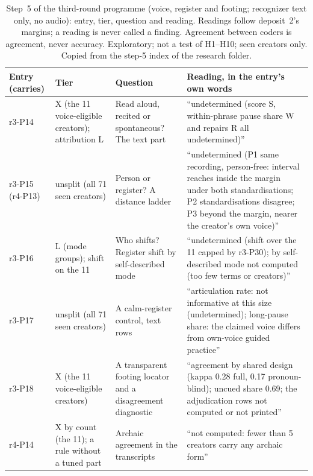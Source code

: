 \begin{table}[tp]
\centering
\footnotesize
\begin{tabular}{@{}>{\raggedright\arraybackslash}p{}>{\raggedright\arraybackslash}p{}>{\raggedright\arraybackslash}p{}p{}@{}}
\toprule
Entry (carries) & Tier & Question & Reading, in the entry's own words \\
\midrule
r3-P14 & X (the 11 voice-eligible creators); attribution L & Read aloud, recited or spontaneous? The text part &
``undetermined (score S, within-phrase pause share W and repairs R all undetermined)'' \\
r3-P15 (r4-P13) & unsplit (all 71 seen creators) & Person or register? A distance ladder & ``undetermined (P1 same
recording, person-free: interval reaches inside the margin under both standardisations; P2 standardisations disagree; P3
beyond the margin, nearer the creator's own voice)'' \\
r3-P16 & L (mode groups); shift on the 11 & Who shifts? Register shift by self-described mode & ``undetermined (shift
over the 11 capped by r3-P30); by self-described mode not computed (too few terms or creators)'' \\
r3-P17 & unsplit (all 71 seen creators) & A calm-register control, text rows & ``articulation rate: not informative at
this size (undetermined); long-pause share: the claimed voice differs from own-voice guided practice'' \\
r3-P18 & X (the 11 voice-eligible creators) & A transparent footing locator and a disagreement diagnostic &
``agreement by shared design (kappa 0.28 full, 0.17 pronoun-blind); uncued share 0.69; the adjudication rows not
computed or not printed'' \\
r4-P14 & X by count (the 11); a rule without a tuned part & Archaic agreement in the transcripts & ``not computed:
fewer than 5 creators carry any archaic form'' \\
\bottomrule
\end{tabular}
\caption{Step~5 of the third-round programme (voice, register and footing; recognizer text only, no audio): entry,
tier, question and reading. Readings follow deposit~2's margins; a reading is never called a finding. Agreement between
coders is agreement, never accuracy. Exploratory; not a test of H1--H10; seen creators only. Copied from the step-5
index of the research folder. \LabelValidity}
\label{tab:panel3-step5}
\end{table}

